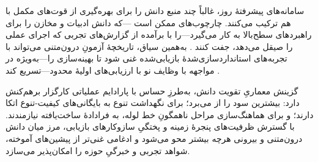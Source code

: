 سامانه‌های پیشرفتهٔ روز، غالباً چند منبع دانش را برای بهره‌گیری از قوت‌های مکمل با هم ترکیب می‌کنند. چارچوب‌های  ممکن است —که دانش ادبیات و مخازن را برای راهبردهای سطح‌بالا به کار می‌گیرد—را با  برآمده از گزارش‌های تجربی که اجرای عملی را صیقل می‌دهد، جفت کنند \cite{trirat2025automlagent, Yang2025NADER}. به‌همین سیاق، تاریخچهٔ آزمونِ درون‌متنی می‌تواند با تجربه‌های استانداردسازی‌شدهٔ بازیابی‌شده غنی شود تا  بهینه‌سازی را—به‌ویژه در مواجهه با وظایف نو با ارزیابی‌های اولیهٔ محدود—تسریع کند \cite{zhang-etal-2024-MLCopilot}.

گزینش معماریِ تقویت دانش، به‌طرزِ حساس با پارادایم عملیاتی کارگزار برهم‌کنش دارد:  بیشترین سود را از  می‌برد؛  برای نگهداشت تنوع به بایگانی‌های کیفیت-تنوع اتکا دارند؛ و  برای هماهنگ‌سازی مراحل ناهمگونِ خط لوله، به فرادادهٔ ساخت‌یافته نیازمندند. با گسترش ظرفیت‌های پنجرهٔ زمینه و پختگیِ سازوکارهای بازیابی، مرز میان دانش درون‌متنی و بیرونی هرچه بیشتر محو می‌شود و ادغامی غنی‌تر از پیشین‌های آموخته، شواهد تجربی و خبرگیِ حوزه را امکان‌پذیر می‌سازد.